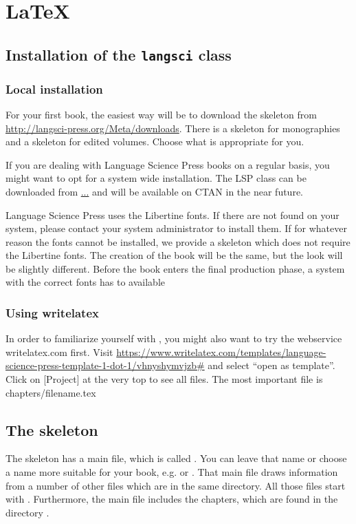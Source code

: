 \chapter{\LaTeX}

\section{Installation of the \texttt{langsci} class}
\subsection{Local installation}
For your first book, the easiest way will be to download the skeleton from \url{http://langsci-press.org/Meta/downloads}.
There is a skeleton for monographies and a skeleton for edited volumes. Choose what is appropriate for you.


If you are dealing with Language Science Press books on a regular basis, you might want to opt for a system wide installation. The LSP class can be downloaded from \url{...} and will be available on CTAN in the near future.

Language Science Press uses the Libertine fonts. If there are not found on your system, please contact your system administrator to install them. If for whatever reason the fonts cannot be installed, we provide a skeleton which does not require the Libertine fonts. The creation of the book will be the same, but the look will be slightly different. Before the book enters the final production phase, a system with the correct fonts has to available 

\subsection{Using writelatex}
In order to familiarize yourself with \latex, you might also want to try the webservice writelatex.com first. Visit \url{https://www.writelatex.com/templates/language-science-press-template-1-dot-1/vhnyshymvjzb#} and select ``open as template''. Click on [Project] at the very top to see all files. The most important file is chapters/filename.tex

\section{The skeleton}
The skeleton has a main file, which is called . You can leave that name or choose a name more suitable for your book, e.g.  or . That main file draws information from a number of other files which are in the same directory. All those files start with . Furthermore, the main file includes the chapters, which are found in the directory .

